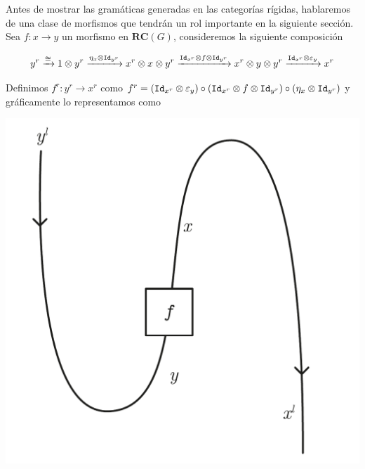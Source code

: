 \documentclass[../main.tex]{subfiles}
\begin{document}
    Antes de mostrar las gramáticas generadas en las categorías rígidas, hablaremos de una clase de morfismos que tendrán un rol importante en la siguiente sección. \\

    Sea $f: x \to y$ un morfismo en $\textbf{RC}(G)$, consideremos la siguiente composición

    $$y^r \xrightarrow[]{\cong} 1 \otimes y^r \xrightarrow[]{\eta_x \otimes \texttt{Id}_{y^r}} x^r \otimes x \otimes y^r \xrightarrow[]{\texttt{Id}_{x^r} \otimes f \otimes \texttt{Id}_{y^r}} x^r \otimes y \otimes y^r \xrightarrow[]{\texttt{Id}_{x^r} \otimes \varepsilon_y} x^r$$

    Definimos $f^r:y^r \to x^r$ como $f^r = (\texttt{Id}_{x^r} \otimes \varepsilon_y) \circ (\texttt{Id}_{x^r} \otimes f \otimes \texttt{Id}_{y^r}) \circ (\eta_x \otimes \texttt{Id}_{y^r})$ y gráficamente lo representamos como 
    \begin{center}
        \includegraphics[scale=.3]{TeX/diagrama/5-6.pdf}
    \end{center}
\end{document}
